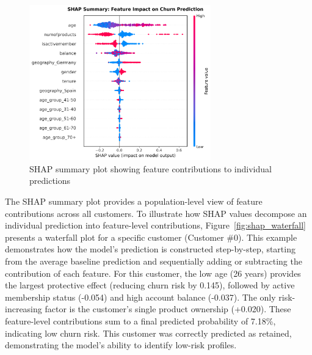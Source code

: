 \documentclass[12pt]{article}
\begin{document}
\begin{figure}[H]
\centering
\includegraphics[width=0.7\textwidth]{img/20_shap_summary.png}
\caption{SHAP summary plot showing feature contributions to individual predictions}
\label{fig:shap}
\end{figure}

The SHAP summary plot provides a population-level view of feature contributions across all customers. To illustrate how SHAP values decompose an individual prediction into feature-level contributions, Figure~\ref{fig:shap_waterfall} presents a waterfall plot for a specific customer (Customer \#0). This example demonstrates how the model's prediction is constructed step-by-step, starting from the average baseline prediction and sequentially adding or subtracting the contribution of each feature. For this customer, the low age (26 years) provides the largest protective effect (reducing churn risk by 0.145), followed by active membership status (-0.054) and high account balance (-0.037). The only risk-increasing factor is the customer's single product ownership (+0.020). These feature-level contributions sum to a final predicted probability of 7.18\%, indicating low churn risk. This customer was correctly predicted as retained, demonstrating the model's ability to identify low-risk profiles.
\end{document}
